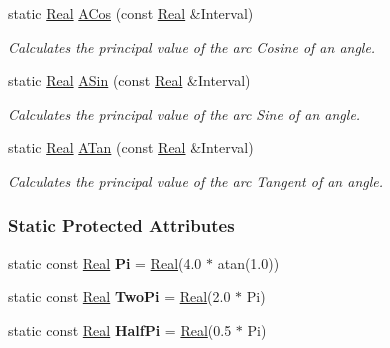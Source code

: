 \begin{DoxyCompactItemize}
static \hyperlink{namespacephys_af7eb897198d265b8e868f45240230d5f}{Real} \hyperlink{classphys_1_1MathTool_a42fe1e0bd7b1472567b126da4b512a5d}{ACos} (const \hyperlink{namespacephys_af7eb897198d265b8e868f45240230d5f}{Real} \&Interval)
\begin{DoxyCompactList}\small\item\em Calculates the principal value of the arc Cosine of an angle. \item\end{DoxyCompactList}\item 
static \hyperlink{namespacephys_af7eb897198d265b8e868f45240230d5f}{Real} \hyperlink{classphys_1_1MathTool_a89e9613eea236a9729a08500c47283d3}{ASin} (const \hyperlink{namespacephys_af7eb897198d265b8e868f45240230d5f}{Real} \&Interval)
\begin{DoxyCompactList}\small\item\em Calculates the principal value of the arc Sine of an angle. \item\end{DoxyCompactList}\item 
static \hyperlink{namespacephys_af7eb897198d265b8e868f45240230d5f}{Real} \hyperlink{classphys_1_1MathTool_ac421007a0a5c5e0b29b832f841327cb0}{ATan} (const \hyperlink{namespacephys_af7eb897198d265b8e868f45240230d5f}{Real} \&Interval)
\begin{DoxyCompactList}\small\item\em Calculates the principal value of the arc Tangent of an angle. \item\end{DoxyCompactList}\end{DoxyCompactItemize}
\subsubsection*{Static Protected Attributes}
\begin{DoxyCompactItemize}
\item 
\hypertarget{classphys_1_1MathTool_ac887c964924c64cc3fa821ffa487761f}{
static const \hyperlink{namespacephys_af7eb897198d265b8e868f45240230d5f}{Real} {\bfseries Pi} = \hyperlink{namespacephys_af7eb897198d265b8e868f45240230d5f}{Real}(4.0 $\ast$ atan(1.0))}
\label{classphys_1_1MathTool_ac887c964924c64cc3fa821ffa487761f}

\item 
\hypertarget{classphys_1_1MathTool_a85392fa7027d7e4e236b06a78f53ab98}{
static const \hyperlink{namespacephys_af7eb897198d265b8e868f45240230d5f}{Real} {\bfseries TwoPi} = \hyperlink{namespacephys_af7eb897198d265b8e868f45240230d5f}{Real}(2.0 $\ast$ Pi)}
\label{classphys_1_1MathTool_a85392fa7027d7e4e236b06a78f53ab98}

\item 
\hypertarget{classphys_1_1MathTool_ae06c08968247612787b7c0b9fbd89c04}{
static const \hyperlink{namespacephys_af7eb897198d265b8e868f45240230d5f}{Real} {\bfseries HalfPi} = \hyperlink{namespacephys_af7eb897198d265b8e868f45240230d5f}{Real}(0.5 $\ast$ Pi)}
\label{classphys_1_1MathTool_ae06c08968247612787b7c0b9fbd89c04}

\end{DoxyCompactItemize}


